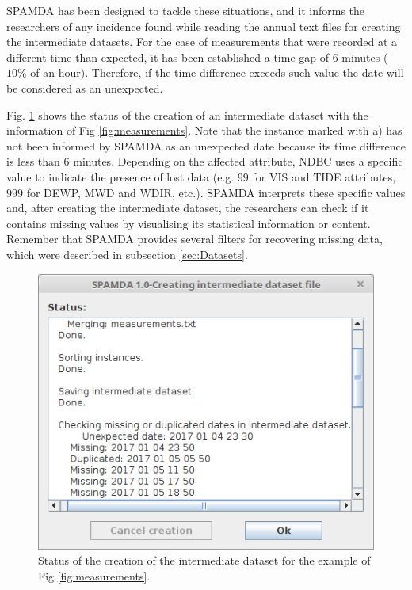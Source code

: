 \documentclass[energies,article,submit,moreauthors,pdftex]{Definitions/mdpi}
\begin{document}
		SPAMDA has been designed to tackle these situations, and it informs the researchers of any incidence found while reading the annual text files for creating the intermediate datasets. For the case of measurements that were recorded at a different time than expected, it has been established a time gap of 6 minutes ($10\%$ of an hour). Therefore, if the time difference exceeds such value the date will be considered as an unexpected.
		
		Fig. \ref{fig:creatingDataset} shows the status of the creation of an intermediate dataset with the information of Fig \ref{fig:measurements}. Note that the instance marked with a) has not been informed by SPAMDA as an unexpected date because its time difference is less than $6$ minutes. Depending on the affected attribute, NDBC uses a specific value \cite{NOAA_3} to indicate the presence of lost data (e.g. $99$ for VIS and TIDE attributes, $999$ for DEWP, MWD and WDIR, etc.). SPAMDA interprets these specific values and, after creating the intermediate dataset, the researchers can check if it contains missing values by visualising its statistical information or content. Remember that SPAMDA provides several filters for recovering missing data, which were described in subsection \ref{sec:Datasets}.
		
		\begin{figure}[ht!]
			\centering
			\includegraphics[scale=0.40]{figures/FigureCreatingDataset.png}
			\caption{Status of the creation of the intermediate dataset for the example of Fig \ref{fig:measurements}.}
			\label{fig:creatingDataset}
		\end{figure}
		
\end{document}
